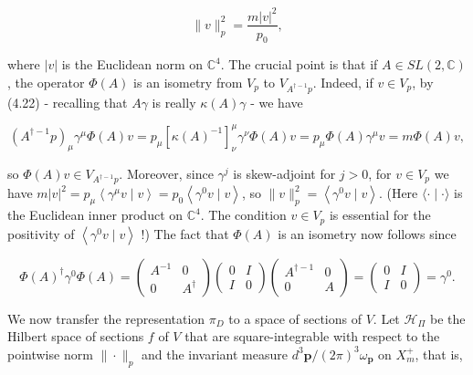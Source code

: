 \documentclass[10pt, letterpaper]{article}
\begin{document}
$$
\|v\|_{p}^{2}=\frac{m|v|^{2}}{p_{0}},
$$

where $|v|$ is the Euclidean norm on $\mathbb{C}^{4}$. The crucial point is that if $A \in S L(2, \mathbb{C})$, the operator $\Phi(A)$ is an isometry from $V_{p}$ to $V_{A^{\dagger-1} p}$. Indeed, if $v \in V_{p}$, by (4.22) - recalling that $A \gamma$ is really $\kappa(A) \gamma$ - we have

$$
\left(A^{\dagger-1} p\right)_{\mu} \gamma^{\mu} \Phi(A) v=p_{\mu}\left[\kappa(A)^{-1}\right]_{\nu}^{\mu} \gamma^{\nu} \Phi(A) v=p_{\mu} \Phi(A) \gamma^{\mu} v=m \Phi(A) v,
$$

so $\Phi(A) v \in V_{A^{\dagger-1} p}$. Moreover, since $\gamma^{j}$ is skew-adjoint for $j>0$, for $v \in V_{p}$ we have $m|v|^{2}=p_{\mu}\left\langle\gamma^{\mu} v \mid v\right\rangle=p_{0}\left\langle\gamma^{0} v \mid v\right\rangle$, so $\|v\|_{p}^{2}=\left\langle\gamma^{0} v \mid v\right\rangle$. (Here $\langle\cdot \mid \cdot\rangle$ is the Euclidean inner product on $\mathbb{C}^{4}$. The condition $v \in V_{p}$ is essential for the positivity of $\left\langle\gamma^{0} v \mid v\right\rangle$ !) The fact that $\Phi(A)$ is an isometry now follows since

$$
\Phi(A)^{\dagger} \gamma^{0} \Phi(A)=\left(\begin{array}{cc}
A^{-1} & 0 \\
0 & A^{\dagger}
\end{array}\right)\left(\begin{array}{cc}
0 & I \\
I & 0
\end{array}\right)\left(\begin{array}{cc}
A^{\dagger-1} & 0 \\
0 & A
\end{array}\right)=\left(\begin{array}{cc}
0 & I \\
I & 0
\end{array}\right)=\gamma^{0} .
$$

We now transfer the representation $\pi_{D}$ to a space of sections of $V$. Let $\mathcal{H}_{\Pi}$ be the Hilbert space of sections $f$ of $V$ that are square-integrable with respect to the pointwise norm $\|\cdot\|_{p}$ and the invariant measure $d^{3} \mathbf{p} /(2 \pi)^{3} \omega_{\mathbf{p}}$ on $X_{m}^{+}$, that is,
\end{document}
